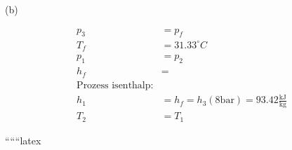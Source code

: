 (b)

\begin{align*}
    p_3 &= p_f \\
    T_f &= 31.33^\circ C \\
    p_1 &= p_2 \\
    h_f &= \\
    \text{Prozess isenthalp:} \\
    h_1 &= h_f = h_3 (8 \text{bar}) = 93.42 \frac{\text{kJ}}{\text{kg}} \\
    T_2 &= T_1
\end{align*}

``````latex